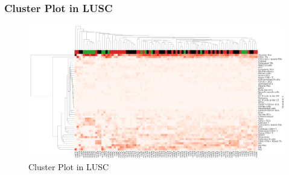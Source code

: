 \documentclass{beamer}
\begin{document}
    \begin{frame}
        \frametitle{Cluster Plot in LUSC}

        \begin{figure}
            \includegraphics[height=0.6 \textheight]{figures/BisqueRNA/clustermap/STAR.SQC.cluster.pdf}
            \caption{Cluster Plot in LUSC}
        \end{figure}
    \end{frame}
\end{document}
